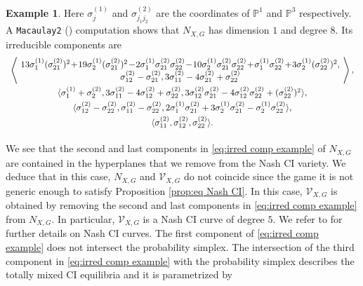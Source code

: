 \documentclass[11pt]{amsart}
\numberwithin{equation}{section}
\theoremstyle{plain}
\numberwithin{theorem}{section}
\theoremstyle{definition}
\newtheorem{example}[theorem]{Example}
\newcommand{\PP}{{\mathbb P}}
\begin{document}
\begin{example}
Here $\sigma^{(1)}_j$ and $\sigma^{(2)}_{j_1j_2}$ are the coordinates of $\PP^1$ and $\PP^3$ respectively. A \texttt{Macaulay2} (\cite{connelly2025gametheory}) computation shows that $N_{X,G}$ has dimension $1$ and degree $8$. Its irreducible components are 
\begin{equation}\label{eq:irred comp example}
\begin{array}{c}
\vspace*{1mm}
\left\langle \!
    \begin{array}{c} 13\sigma^{(1)}_1(\sigma^{(2)}_{21})^2\!+\!19\sigma^{(1)}_2(\sigma^{(2)}_{21})^2\!-\!2 \sigma^{(1)}_1\sigma^{(2)}_{21}\sigma^{(2)}_{22}\!-\!10\sigma^{(1)}_2\sigma^{(2)}_{21}\sigma^{(2)}_{22}\!+\!\sigma^{(1)}_1\sigma^{(2)}_{22} \!+\! 3 \sigma_2^{(1)} (\sigma_{22}^{(2)})^{2},
    \\ \sigma^{(2)}_{12}-\sigma^{(2)}_{21},3\sigma^{(2)}_{11}-4\sigma^{(2)}_{21}+\sigma^{(2)}_{22} 
   \end{array}\!\right \rangle,
         \\
         \vspace*{1mm}
     \langle     \sigma^{(1)}_1+\sigma^{(2)}_2,3\sigma^{(2)}_{11}-4\sigma^{(2)}_{12}+\sigma^{(2)}_{22},3\sigma^{(2)}_{12}\sigma^{(2)}_{21}-4\sigma^{(2)}_{12}\sigma^{(2)}_{22}+(\sigma^{(2)}_{22})^2
     \rangle ,
    
       \\
     \vspace*{1mm}
     \langle \sigma^{(2)}_{12}-\sigma^{(2)}_{22},\sigma^{(2)}_{11}-\sigma^{(2)}_{22},2\sigma^{(1)}_1\sigma^{(2)}_{21}+3\sigma^{(1)}_2\sigma^{(2)}_{21}-\sigma^{(1)}_2\sigma^{(2)}_{22}\rangle,
    
    \\ \vspace*{1mm}
      \langle \sigma^{(2)}_{11},\sigma^{(2)}_{12},\sigma^{(2)}_{22}\rangle.  
      
\end{array}
\end{equation}


We see that the second and last components in \eqref{eq:irred comp example} of $N_{X,G}$ are contained in the hyperplanes that we remove from the Nash CI variety. We deduce that in this case, $N_{X,G}$ and $\mathcal{V}_{X,G}$ do not coincide since the game it is not generic enough to satisfy Proposition \ref{prop:eq Nash CI}. In this case, $\mathcal{V}_{X,G}$ is obtained by removing the second and last components in \eqref{eq:irred comp example} from $N_{X,G}$. In particular, $\mathcal{V}_{X,G}$ is a Nash CI curve of degree $5$. We refer to \cite{portakal2024nash} for further details on Nash CI curves. 
The first component of \eqref{eq:irred comp example} does not intersect the probability simplex.
The intersection of the third component in \eqref{eq:irred comp example} with the probability simplex describes the totally mixed CI equilibria and it is parametrized by


\end{example}
\end{document}
